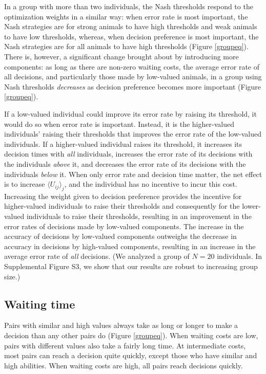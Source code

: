 \documentclass{pnastwo}
\begin{document}
\begin{article}
In a group with more than two individuals, the Nash thresholds respond to the optimization weights in a similar way: when error rate is most important, the Nash strategies are for strong animals to have high thresholds and weak animals to have low thresholds, whereas, when decision preference is most important, the Nash strategies are for all animals to have high thresholds (Figure \ref{groupeq}). There is, however, a significant change brought about by introducing more components: as long as there are non-zero waiting costs, the average error rate of all decisions, and particularly those made by low-valued animals, in a group using Nash thresholds \emph{decreases} as decision preference becomes more important (Figure \ref{groupeq}).  

If a low-valued individual could improve its error rate by raising its threshold, it would do so when error rate is important.  Instead, it is the higher-valued individuals' raising their thresholds that improves the error rate of the low-valued individuals. If a higher-valued individual raises its threshold, it increases its decision times with \emph{all} individuals, increases the error rate of its decisions with the individuals \emph{above} it, and decreases the error rate of its decisions with the individuals \emph{below} it. When only error rate and decision time matter, the net effect is to increase $\langle U_{ij}\rangle _j$, and the individual has no incentive to incur this cost. Increasing the weight given to decision preference provides the incentive for higher-valued individuals to raise their thresholds and consequently for the lower-valued individuals to raise their thresholds, resulting in an improvement in the error rates of decisions made by low-valued components.  The increase in the accuracy of decisions by low-valued components outweighs the decrease in accuracy in decisions by high-valued components, resulting in an increase in the average error rate of \emph{all} decisions. (We analyzed a group of $N=20$ individuals.  In Supplemental Figure S3, we show that our results are robust to increasing group size.)

\subsection{Waiting time }
Pairs with similar and high values always take as long or longer to make a decision than any other pairs do  (Figure \ref{groupeq}). When waiting costs are low, pairs with different values also take a fairly long time.  At intermediate costs, most pairs can reach a decision quite quickly, except those who have similar and high abilities.  When waiting costs are high, all pairs reach decisions quickly.   


\end{article}
\end{document}
